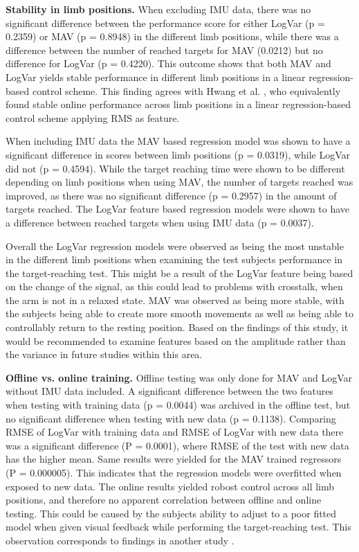 \documentclass[a4paper, 10pt, conference]{ieeeconf}      %
\begin{document}
\begin{multicol}{2}
\textbf{Stability in limb positions.}
When excluding IMU data, there was no significant difference between the performance score for either LogVar (p = 0.2359) or MAV (p = 0.8948) in the different limb positions, while there was a difference between the number of reached targets for MAV (0.0212) but no difference for LogVar (p = 0.4220). This outcome shows that both MAV and LogVar yields stable performance in different limb positions in a linear regression-based control scheme. This finding agrees with Hwang et al. \cite{Hwang2017}, who equivalently found stable online performance across limb positions in a linear regression-based control scheme applying RMS as feature.

When including IMU data the MAV based regression model was shown to have a significant difference in scores between limb positions (p = 0.0319), while LogVar did not (p = 0.4594). While the target reaching time were shown to be different depending on limb positions when using MAV, the number of targets reached was improved, as there was no significant difference (p = 0.2957) in the amount of targets reached. The LogVar feature based regression models were shown to have a difference between reached targets when using IMU data (p = 0.0037).

Overall the LogVar regression models were observed as being the most unstable in the different limb positions when examining the test subjects performance in the target-reaching test. This might be a result of the LogVar feature being based on the change of the signal, as this could lead to problems with crosstalk, when the arm is not in a relaxed state. MAV was observed as being more stable, with the subjects being able to create more smooth movements as well as being able to controllably return to the resting position. Based on the findings of this study, it would be recommended to examine features based on the amplitude rather than the variance in future studies within this area.

\textbf{Offline vs. online training.}
Offline testing was only done for MAV and LogVar without IMU data included. A significant difference between the two features when testing with training data (p = 0.0044) was archived in the offline test, but no significant difference when testing with new data (p = 0.1138). Comparing RMSE of LogVar with training data and RMSE of LogVar with new data there was a significant difference (P = 0.0001), where RMSE of the test with new data has the higher mean. Same results were yielded for the MAV trained regressors (P = 0.000005). This indicates that the regression models were overfitted when exposed to new data. The online results yielded robost control across all limb positions, and therefore no apparent correlation between offline and online testing. This could be caused by the subjects ability to adjust to a poor fitted model when given visual feedback while performing the target-reaching test. This observation corresponds to findings in another study \cite{jiang2010}.


\end{multicol}
\end{document}
